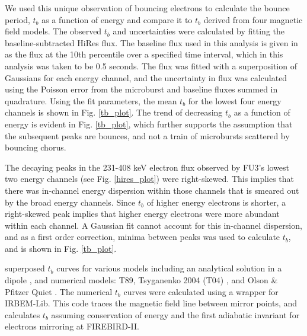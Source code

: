 \documentclass[draft, linenumbers]{agujournal}
\begin{document}
We used this unique observation of bouncing electrons to calculate the bounce period, $t_b$ as a function of energy and compare it to $t_b$ derived from four magnetic field models. The observed $t_b$ and uncertainties were calculated by fitting the baseline-subtracted HiRes flux. The baseline flux used in this analysis is given in \citet{O'Brien2004} as the flux at the 10th percentile over a specified time interval, which in this analysis was taken to be 0.5 seconds. The flux was fitted with a superposition of Gaussians for each energy channel, and the uncertainty in flux was calculated using the Poisson error from the microburst and baseline fluxes summed in quadrature. Using the fit parameters, the mean $t_b$ for the lowest four energy channels is shown in Fig. \ref{tb_plot}. The trend of decreasing $t_b$ as a function of energy is evident in Fig. \ref{tb_plot}, which further supports the assumption that the subsequent peaks are bounces, and not a train of microbursts scattered by bouncing chorus. 

The decaying peaks in the 231-408 keV electron flux observed by FU3's lowest two energy channels (see Fig. \ref{hires_plot}) were right-skewed. This implies that there was in-channel energy dispersion within those channels that is smeared out by the broad energy channels. Since $t_b$ of higher energy electrons is shorter, a right-skewed peak implies that higher energy electrons were more abundant within each channel. A Gaussian fit cannot account for this in-channel dispersion, and as a first order correction, minima between peaks was used to calculate $t_b$, and is shown in Fig. \ref{tb_plot}. 

 superposed  $t_b$ curves for various models including an analytical solution in a dipole \citep{Schulz1974}, and numerical models: T89, Tsyganenko 2004 (T04) \citep{Tsyganenko2005}, and Olson \& Pfitzer Quiet \citep{Olson1982} . The numerical $t_b$ curves were calculated using a wrapper for IRBEM-Lib. This code traces the magnetic field line between mirror points, and calculates $t_b$ assuming conservation of energy and the first adiabatic invariant for electrons mirroring at FIREBIRD-II.  
\end{document}
